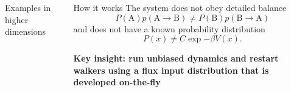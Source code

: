 \documentclass[final]{beamer}
\begin{document}
\begin{columns}[t]
\begin{column}{.25 \linewidth}
\begin{block}{Examples in higher dimensions}
\begin{columns}[t]
\begin{column}{.33\linewidth}
\begin{figure}
		  \end{figure}
		\end{column}

	  \end{columns}
        \end{block}
      \end{column}

      \begin{column}{.25 \linewidth}
	\begin{block}{How it works}
	  The system does not obey detailed balance 
	  \begin{equation*}
	    P(\text{A})p(\text{A} \rightarrow \text{B}) \neq P(\text{B})p(\text{B} \rightarrow \text{A}) 
	  \end{equation*}
	  and does not have a known probability distribution
	  \begin{equation*}
	    P(x) \neq C\exp{-\beta V(x)}.
	  \end{equation*}

	  \textbf{Key insight:  run unbiased dynamics and restart walkers using a flux input distribution that is developed on-the-fly}

	  \vspace{20 mm}


\end{block}
\end{column}
\end{columns}
\end{document}
